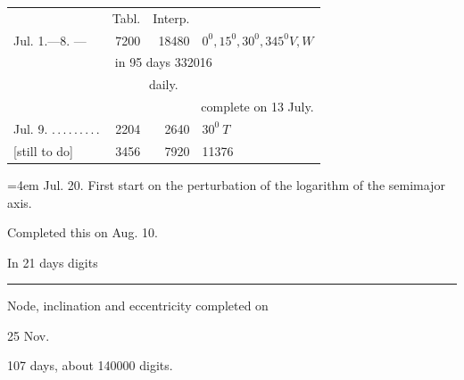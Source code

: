 \begin{center}
\begin{tabular}{@{}p{.32\linewidth}rrl@{}}
&Tabl.&Interp.&\\
Jul. 1.—8. \BJournalDay{☿}—\BJournalDay{☿}&7200&18480&\(\mathit{0}^0,\mathit{15}^0,\mathit{30}^0,\mathit{345}^0 V,W\)\\
\multicolumn{4}{c}{in 95 days 332016}\\
\multicolumn{4}{c}{daily.\qquad 3495}\\
\multicolumn{4}{r}{complete on 13 July.}\\
Jul. 9. \BJournalDay{♃}\nobreak\hspace{.2em}\mbox{.\,.\,.\,.\,.\,.\,.\,.\,.}\hfill&2204&2640&\(\mathit{30}^0\ T\)\\
\hfill [still to do]&3456&7920&11376\\
\hline
\end{tabular}
\end{center}
\noindent\hangindent=4em Jul. 20. First start on the perturbation of the logarithm of the semimajor axis.\par
\begin{center}
Completed this on Aug. 10. \par
In 21 days digits\par\smallskip
\rule{.25\linewidth}{.3pt}\par\smallskip
Node, inclination and eccentricity completed on\par
25 Nov. \par
107 days, about 140000 digits.
\end{center}
\endgroup
\clearpage
\endgroup

